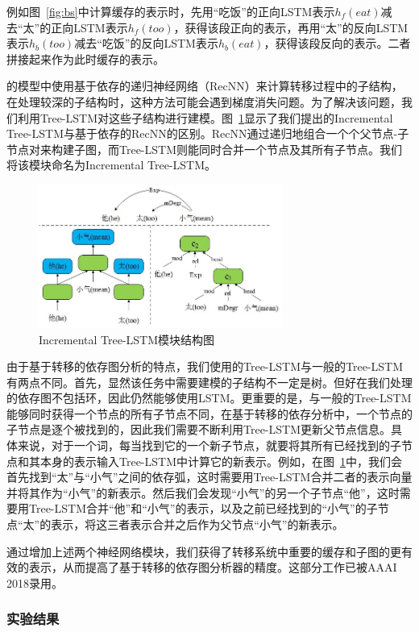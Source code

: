 例如图~\ref{fig:bs}中计算缓存的表示时，先用“吃饭”的正向LSTM表示$h_f(eat)$减去“太”的正向LSTM表示$h_f(too)$，获得该段正向的表示，再用“太”的反向LSTM表示$h_b(too)$减去“吃饭”的反向LSTM表示$h_b(eat)$，获得该段反向的表示。二者拼接起来作为此时缓存的表示。

的模型中使用基于依存的递归神经网络（RecNN）来计算转移过程中的子结构，在处理较深的子结构时，这种方法可能会遇到梯度消失问题。为了解决该问题，我们利用Tree-LSTM对这些子结构进行建模。图~\ref{fig:it}显示了我们提出的Incremental Tree-LSTM与基于依存的RecNN的区别。RecNN通过递归地组合一个个父节点-子节点对来构建子图，而Tree-LSTM则能同时合并一个节点及其所有子节点。我们将该模块命名为Incremental Tree-LSTM。

\begin{figure}[hbtp]
	\centering
	\includegraphics[width=80mm]{picture/it.jpg}
	\caption{Incremental Tree-LSTM模块结构图}
	\label{fig:it}
\end{figure}

由于基于转移的依存图分析的特点，我们使用的Tree-LSTM与一般的Tree-LSTM有两点不同。首先，显然该任务中需要建模的子结构不一定是树。但好在我们处理的依存图不包括环，因此仍然能够使用LSTM。更重要的是，与一般的Tree-LSTM能够同时获得一个节点的所有子节点不同，在基于转移的依存分析中，一个节点的子节点是逐个被找到的，因此我们需要不断利用Tree-LSTM更新父节点信息。具体来说，对于一个词，每当找到它的一个新子节点，就要将其所有已经找到的子节点和其本身的表示输入Tree-LSTM中计算它的新表示。例如，在图~\ref{fig:it}中，我们会首先找到“太”与“小气”之间的依存弧，这时需要用Tree-LSTM合并二者的表示向量并将其作为“小气”的新表示。然后我们会发现“小气”的另一个子节点“他”，这时需要用Tree-LSTM合并“他”和“小气”的表示，以及之前已经找到的“小气”的子节点“太”的表示，将这三者表示合并之后作为父节点“小气”的新表示。

通过增加上述两个神经网络模块，我们获得了转移系统中重要的缓存和子图的更有效的表示，从而提高了基于转移的依存图分析器的精度。这部分工作已被AAAI 2018录用。

\subsubsection{实验结果}

